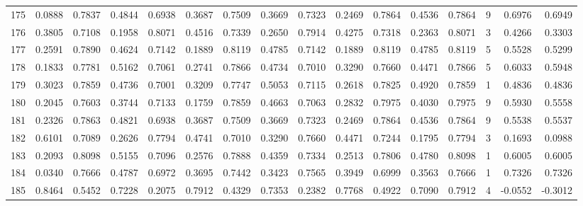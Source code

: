 \begin{tabular}{lrrrrrrrrrrrrrrr}
175 &      0.0888 &  0.7837 &  0.4844 &  0.6938 &  0.3687 &  0.7509 &  0.3669 &  0.7323 &  0.2469 &  0.7864 &   0.4536 &     0.7864 &      9 &                    0.6976 &                     0.6949 \\
176 &      0.3805 &  0.7108 &  0.1958 &  0.8071 &  0.4516 &  0.7339 &  0.2650 &  0.7914 &  0.4275 &  0.7318 &   0.2363 &     0.8071 &      3 &                    0.4266 &                     0.3303 \\
177 &      0.2591 &  0.7890 &  0.4624 &  0.7142 &  0.1889 &  0.8119 &  0.4785 &  0.7142 &  0.1889 &  0.8119 &   0.4785 &     0.8119 &      5 &                    0.5528 &                     0.5299 \\
178 &      0.1833 &  0.7781 &  0.5162 &  0.7061 &  0.2741 &  0.7866 &  0.4734 &  0.7010 &  0.3290 &  0.7660 &   0.4471 &     0.7866 &      5 &                    0.6033 &                     0.5948 \\
179 &      0.3023 &  0.7859 &  0.4736 &  0.7001 &  0.3209 &  0.7747 &  0.5053 &  0.7115 &  0.2618 &  0.7825 &   0.4920 &     0.7859 &      1 &                    0.4836 &                     0.4836 \\
180 &      0.2045 &  0.7603 &  0.3744 &  0.7133 &  0.1759 &  0.7859 &  0.4663 &  0.7063 &  0.2832 &  0.7975 &   0.4030 &     0.7975 &      9 &                    0.5930 &                     0.5558 \\
181 &      0.2326 &  0.7863 &  0.4821 &  0.6938 &  0.3687 &  0.7509 &  0.3669 &  0.7323 &  0.2469 &  0.7864 &   0.4536 &     0.7864 &      9 &                    0.5538 &                     0.5537 \\
182 &      0.6101 &  0.7089 &  0.2626 &  0.7794 &  0.4741 &  0.7010 &  0.3290 &  0.7660 &  0.4471 &  0.7244 &   0.1795 &     0.7794 &      3 &                    0.1693 &                     0.0988 \\
183 &      0.2093 &  0.8098 &  0.5155 &  0.7096 &  0.2576 &  0.7888 &  0.4359 &  0.7334 &  0.2513 &  0.7806 &   0.4780 &     0.8098 &      1 &                    0.6005 &                     0.6005 \\
184 &      0.0340 &  0.7666 &  0.4787 &  0.6972 &  0.3695 &  0.7442 &  0.3423 &  0.7565 &  0.3949 &  0.6999 &   0.3563 &     0.7666 &      1 &                    0.7326 &                     0.7326 \\
185 &      0.8464 &  0.5452 &  0.7228 &  0.2075 &  0.7912 &  0.4329 &  0.7353 &  0.2382 &  0.7768 &  0.4922 &   0.7090 &     0.7912 &      4 &                   -0.0552 &                    -0.3012 \\

\end{tabular}
